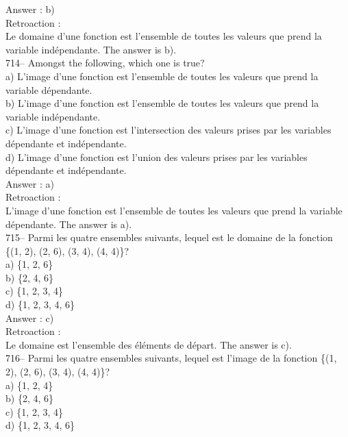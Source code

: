 ﻿\documentclass[letterpaper, 12pt]{article}
\begin{document}
Answer : b)\\

Retroaction : \\
Le domaine d'une fonction est l'ensemble de toutes les valeurs que prend la
variable ind\'ependante.  The answer is b).\\

714--  Amongst the following, which one is true?\\
a) L'image d'une fonction est l'ensemble de toutes les valeurs que prend la
variable d\'ependante.\\
b) L'image d'une fonction est l'ensemble de toutes les valeurs que prend la
variable ind\'ependante.\\
c) L'image d'une fonction est l'intersection des valeurs prises par les
variables d\'ependante et ind\'ependante.\\
d) L'image d'une fonction est l'union des valeurs prises par les variables
d\'ependante et ind\'ependante.\\

Answer : a)\\

Retroaction : \\
L'image d'une fonction est l'ensemble de toutes les valeurs que prend la
variable d\'ependante.  The answer is a).\\

715--  Parmi les quatre ensembles suivants, lequel est le domaine de la
fonction \{(1, 2), (2, 6), (3, 4), (4, 4)\}?\\
a) \{1, 2, 6\}\\
b) \{2, 4, 6\}\\
c) \{1, 2, 3, 4\}\\
d) \{1, 2, 3, 4, 6\}\\

Answer : c)\\

Retroaction : \\
Le domaine est l'ensemble des \'el\'ements de d\'epart.  The answer is
c).\\

716--  Parmi les quatre ensembles suivants, lequel est l'image de la
fonction \{(1, 2), (2, 6), (3, 4), (4, 4)\}?\\
a) \{1, 2, 4\}\\
b) \{2, 4, 6\}\\
c) \{1, 2, 3, 4\}\\
d) \{1, 2, 3, 4, 6\}\\
\end{document}
